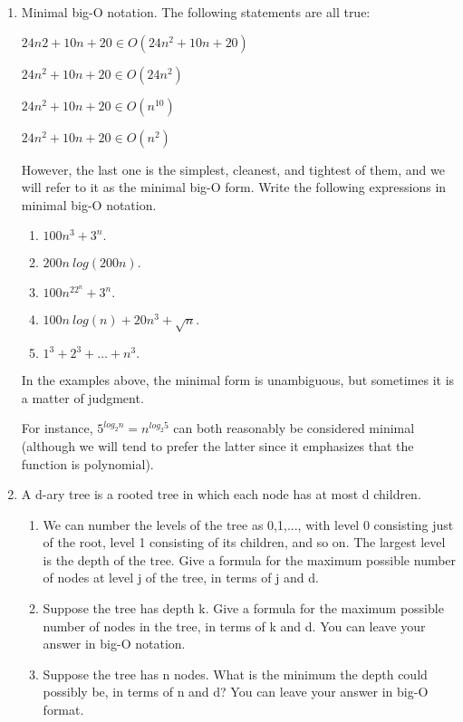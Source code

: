 \documentclass[12pt]{article}
\begin{document}
\begin{enumerate}
\item Minimal big-O notation. The following statements are all true:


$24n2+10n+20 \in  O(24n^2 + 10n + 20)$

$24n^2+10n+20 \in  O(24n^2)$

$24n^2+10n+20 \in  O(n^10)$

$24n^2+10n+20 \in  O(n^2)$


However, the last one is the simplest, cleanest, and tightest of them, and we will refer to it as the minimal big-O form. Write the following expressions in minimal big-O notation.

\begin{enumerate}
\item $100n^3 + 3^n.$
\item $200n~log(200n).$
\item $100n^22^n + 3^n.$
\item $100n~log(n) + 20n^3 + \sqrt{n}.$
\item $1^3 +2^3 + \dots +n^3.$
\end{enumerate}

In the examples above, the minimal form is unambiguous, but sometimes it is a matter of judgment. 

For instance, $5^{log_{2}n} = n^{log_2 5}$ can both reasonably be considered minimal (although we will tend to prefer the latter since it emphasizes that the function is polynomial).

\item A d-ary tree is a rooted tree in which each node has at most d children.
\begin{enumerate}
\item We can number the levels of the tree as 0,1,..., with level 0 consisting just of the root, level 1 consisting of its children, and so on. The largest level is the depth of the tree. Give a formula for the maximum possible number of nodes at level j of the tree, in terms of j and d.

\item Suppose the tree has depth k. Give a formula for the maximum possible number of nodes in the tree, in terms of k and d. You can leave your answer in big-O notation.

\item Suppose the tree has n nodes. What is the minimum the depth could possibly be, in terms of n and d? You can leave your answer in big-O format.
\end{enumerate}

\end{enumerate}
\end{document}
